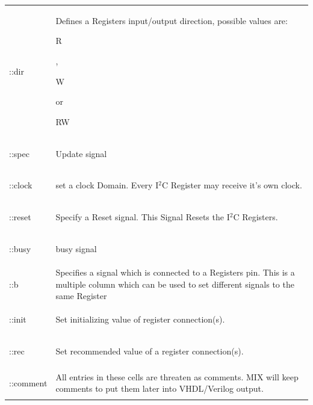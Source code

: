 \documentclass[a4paper,12pt]{report}
\begin{document}
\begin{tabular}{lp{14cm}}
  \begin{bf}::dir\end{bf} & Defines a Registers input/output direction, possible values are: \begin{tt}R\end{tt}, \begin{tt}W\end{tt} or \begin{tt}RW\end{tt}\\
  \begin{bf}::spec\end{bf} & Update signal\\
  \begin{bf}::clock\end{bf} & set a clock Domain. Every I$^2$C Register may receive it's own clock.\\
  \begin{bf}::reset\end{bf} & Specify a Reset signal. This Signal Resets the I$^2$C Registers.\\
  \begin{bf}::busy\end{bf} & busy signal\\
  \begin{bf}::b\end{bf} & Specifies a signal which is connected to a Registers pin. This is a multiple column which can be used to set different signals to the same Register\\
  \begin{bf}::init\end{bf} & Set initializing value of register connection(s).\\
  \begin{bf}::rec\end{bf} & Set recommended value of a register connection(s).\\
  \begin{bf}::comment\end{bf} & All entries in these cells are threaten as comments. MIX will keep comments to put them later into VHDL/Verilog output.\\
\end{tabular}
\end{document}
